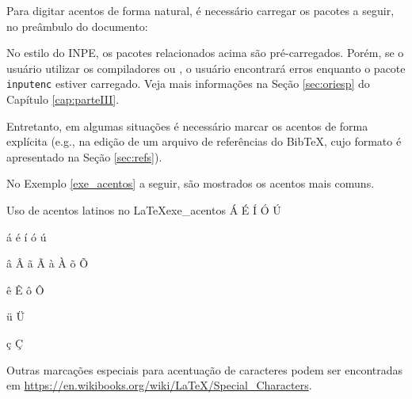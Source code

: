 Para digitar acentos de forma natural, é necessário carregar os pacotes a seguir, no preâmbulo do documento:

\begin{itemize}
    \item \texttt{\usepackage[brazilian]{babel}}
    \item \texttt{\usepackage[T1]{fontenc}}
    \item \texttt{\usepackage[utf8]{inputenc}}\footnotemark[1]
\end{itemize}


\begin{marker}
  No estilo do INPE, os pacotes relacionados acima são pré-carregados. Porém, se o usuário utilizar os compiladores \XeLaTeX{} ou \LuaTeX{}, o usuário encontrará erros enquanto o pacote {\tt inputenc} estiver carregado. Veja mais informações na Seção \ref{sec:oriesp} do Capítulo \ref{cap:parteIII}.
\end{marker}

Entretanto, em algumas situações é necessário marcar os acentos de forma explícita (e.g., na edição de um arquivo de referências do Bib\TeX{}, cujo formato é apresentado na Seção \ref{sec:refs}).

No Exemplo \ref{exe_acentos} a seguir, são mostrados os acentos mais comuns.

\begin{texexptitled}[breakable,center lower,enhanced,middle=2mm,listing side text]{Uso de acentos latinos no \LaTeX{}}{exe_acentos}
\'A \'E \'I \'O \'U

\'a \'e \'i \'o \'u

\^a \^A \~a \~A \`a \`A \~o \~O

\^e \^E \^o \^O

\"u \"U

\c{c} \c{C}
\end{texexptitled}

\begin{marker}
  Outras marcações especiais para acentuação de caracteres podem ser encontradas em \url{https://en.wikibooks.org/wiki/LaTeX/Special_Characters}.
\end{marker}

